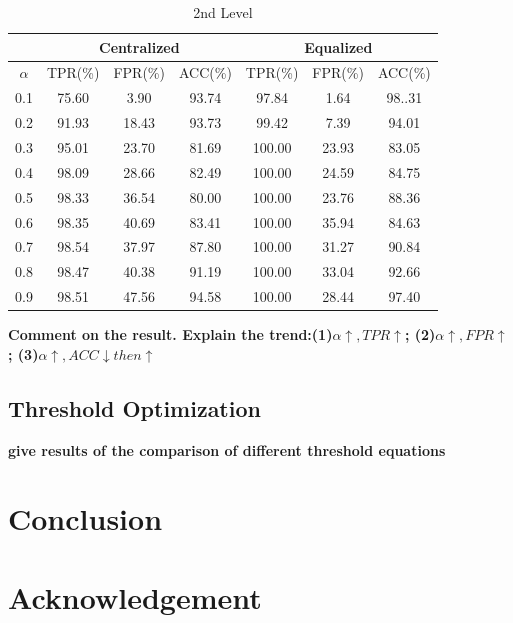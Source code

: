 \documentclass[a4paper]{IEEEtran}
\begin{document}
			\begin{table}[!ht]
				\centering
				\caption{2nd Level}
				\label{tab:syn-result-2nd}
				\begin{tabular}{|c|c|c|c|c|c|c|}
					\hline
					& \multicolumn{3}{c|}{Centralized} & \multicolumn{3}{c|}{Equalized}\\
					\hline
					$\alpha$ & TPR(\%) & FPR(\%) & ACC(\%) & TPR(\%) & FPR(\%) & ACC(\%) \\ 
					\hline
					0.1 & 75.60 & 3.90 & 93.74 & 97.84 & 1.64 & 98..31 \\ 
					\hline
					0.2 & 91.93 & 18.43 & 93.73 & 99.42 & 7.39 & 94.01 \\ 
					\hline
					0.3 & 95.01 & 23.70 & 81.69 & 100.00 & 23.93 & 83.05 \\ 
					\hline
					0.4 & 98.09 & 28.66 & 82.49 & 100.00 & 24.59 & 84.75 \\ 
					\hline
					0.5 & 98.33 & 36.54 & 80.00 & 100.00 & 23.76 & 88.36 \\ 
					\hline
					0.6 & 98.35 & 40.69 & 83.41 & 100.00 & 35.94 & 84.63 \\ 
					\hline
					0.7 & 98.54 & 37.97 & 87.80 & 100.00 & 31.27 & 90.84 \\ 
					\hline
					0.8 & 98.47 & 40.38 & 91.19 & 100.00 & 33.04 & 92.66 \\ 
					\hline
					0.9 & 98.51 & 47.56 & 94.58 & 100.00 & 28.44 & 97.40\\
					\hline
				\end{tabular} 
			\end{table}
			
			\textbf{Comment on the result. Explain the trend:(1)$\alpha \uparrow, TPR \uparrow $; (2)$\alpha \uparrow, FPR \uparrow$; (3)$\alpha \uparrow, ACC \downarrow then \uparrow $}
			
		\subsection{Threshold Optimization}
			\textbf{give results of the comparison of different threshold equations}
		
	\section{Conclusion}\label{sec:conclusion}
	
	\section*{Acknowledgement}
		
	\printbibliography
\end{document}
